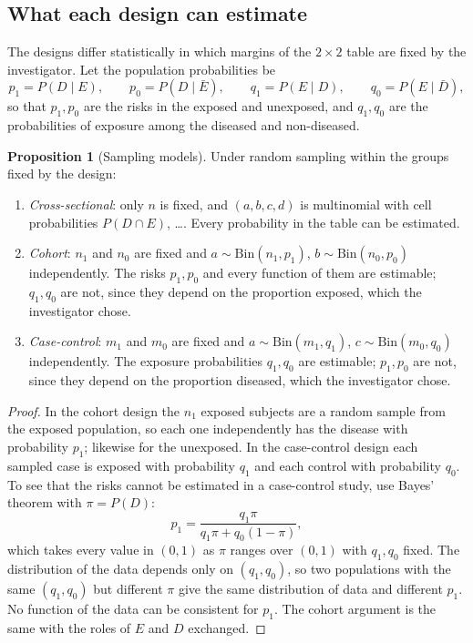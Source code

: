 \documentclass[11pt,a4paper]{article}
\numberwithin{equation}{section}
\theoremstyle{definition}
\newtheorem{prop}[thm]{Proposition}
\begin{document}
\subsection{What each design can estimate}
\label{sec:estimable}

The designs differ statistically in which margins of the $2 \times 2$ table are fixed by the investigator. Let the population
probabilities be
\[
p_1 = P(D \mid E), \qquad p_0 = P(D \mid \bar E), \qquad q_1 = P(E \mid D), \qquad q_0 = P(E \mid \bar D),
\]
so that $p_1, p_0$ are the risks in the exposed and unexposed, and $q_1, q_0$ are the probabilities of exposure among the diseased and
non-diseased.

\begin{prop}[Sampling models]
\label{prop:sampling}
Under random sampling within the groups fixed by the design:
\begin{enumerate}
\item \emph{Cross-sectional}: only $n$ is fixed, and $(a, b, c, d)$ is multinomial with cell probabilities $P(D \cap E)$, \dots.
Every probability in the table can be estimated.
\item \emph{Cohort}: $n_1$ and $n_0$ are fixed and $a \sim \text{Bin}(n_1, p_1)$, $b \sim \text{Bin}(n_0, p_0)$ independently. The risks $p_1, p_0$ and every
function of them are estimable; $q_1, q_0$ are not, since they depend on the proportion exposed, which the investigator chose.
\item \emph{Case-control}: $m_1$ and $m_0$ are fixed and $a \sim \text{Bin}(m_1, q_1)$, $c \sim \text{Bin}(m_0, q_0)$ independently. The exposure
probabilities $q_1, q_0$ are estimable; $p_1, p_0$ are not, since they depend on the proportion diseased, which the investigator chose.
\end{enumerate}
\end{prop}

\begin{proof}
In the cohort design the $n_1$ exposed subjects are a random sample from the exposed population, so each one independently has the
disease with probability $p_1$; likewise for the unexposed. In the case-control design each sampled case is exposed with probability
$q_1$ and each control with probability $q_0$. To see that the risks cannot be estimated in a case-control study, use Bayes' theorem
with $\pi = P(D)$:
\[
p_1 = \frac{q_1 \pi}{q_1 \pi + q_0 (1 - \pi)},
\]
which takes every value in $(0,1)$ as $\pi$ ranges over $(0,1)$ with $q_1, q_0$ fixed. The distribution of the data depends only on $(q_1, q_0)$,
so two populations with the same $(q_1, q_0)$ but different $\pi$ give the same distribution of data and different $p_1$. No function of the data
can be consistent for $p_1$. The cohort argument is the same with the roles of $E$ and $D$ exchanged.
\end{proof}
\end{document}

